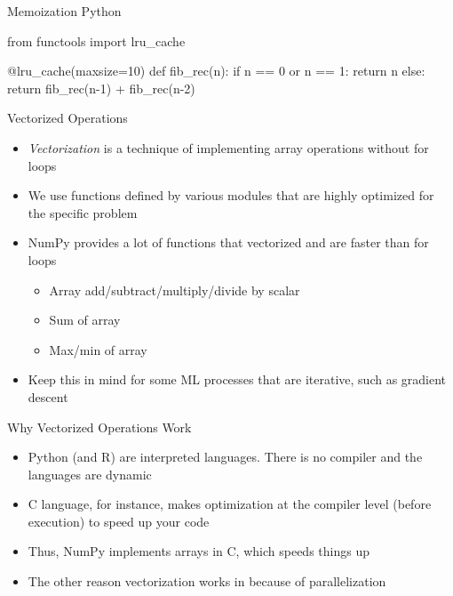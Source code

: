 \documentclass[
  ignorenonframetext,
]{beamer}
\newenvironment{Shaded}{\begin{snugshade}}{\end{snugshade}}
\newcommand{\AttributeTok}[1]{\textcolor[rgb]{0.40,0.45,0.13}{#1}}
\newcommand{\ControlFlowTok}[1]{\textcolor[rgb]{0.00,0.23,0.31}{#1}}
\newcommand{\DecValTok}[1]{\textcolor[rgb]{0.68,0.00,0.00}{#1}}
\newcommand{\ImportTok}[1]{\textcolor[rgb]{0.00,0.46,0.62}{#1}}
\newcommand{\KeywordTok}[1]{\textcolor[rgb]{0.00,0.23,0.31}{#1}}
\newcommand{\NormalTok}[1]{\textcolor[rgb]{0.00,0.23,0.31}{#1}}
\newcommand{\OperatorTok}[1]{\textcolor[rgb]{0.37,0.37,0.37}{#1}}
\begin{document}
\begin{frame}[fragile]{Memoization Python}
\protect\hypertarget{memoization-python-2}{}
\begin{Shaded}
\begin{Highlighting}[]
\ImportTok{from}\NormalTok{ functools }\ImportTok{import}\NormalTok{ lru\_cache}

\AttributeTok{@lru\_cache}\NormalTok{(maxsize}\OperatorTok{=}\DecValTok{10}\NormalTok{)}
\KeywordTok{def}\NormalTok{ fib\_rec(n):}
  \ControlFlowTok{if}\NormalTok{ n }\OperatorTok{==} \DecValTok{0} \KeywordTok{or}\NormalTok{ n }\OperatorTok{==} \DecValTok{1}\NormalTok{:}
    \ControlFlowTok{return}\NormalTok{ n}
  \ControlFlowTok{else}\NormalTok{:}
    \ControlFlowTok{return}\NormalTok{ fib\_rec(n}\OperatorTok{{-}}\DecValTok{1}\NormalTok{) }\OperatorTok{+}\NormalTok{ fib\_rec(n}\OperatorTok{{-}}\DecValTok{2}\NormalTok{)}
\end{Highlighting}
\end{Shaded}
\end{frame}

\begin{frame}{Vectorized Operations}
\protect\hypertarget{vectorized-operations}{}
\begin{itemize}
\item
  \emph{Vectorization} is a technique of implementing array operations
  without for loops
\item
  We use functions defined by various modules that are highly optimized
  for the specific problem
\item
  NumPy provides a lot of functions that vectorized and are faster than
  for loops

  \begin{itemize}
  \item
    Array add/subtract/multiply/divide by scalar
  \item
    Sum of array
  \item
    Max/min of array
  \end{itemize}
\item
  Keep this in mind for some ML processes that are iterative, such as
  gradient descent
\end{itemize}
\end{frame}

\begin{frame}{Why Vectorized Operations Work}
\protect\hypertarget{why-vectorized-operations-work}{}
\begin{itemize}
\item
  Python (and R) are interpreted languages. There is no compiler and the
  languages are dynamic
\item
  C language, for instance, makes optimization at the compiler level
  (before execution) to speed up your code
\item
  Thus, NumPy implements arrays in C, which speeds things up
\item
  The other reason vectorization works in because of parallelization
\end{itemize}
\end{frame}
\end{document}
